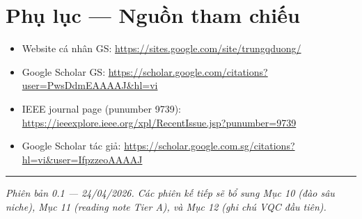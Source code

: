 \documentclass[11pt,a4paper]{article}
\begin{document}
\section*{Phụ lục --- Nguồn tham chiếu}

\begin{itemize}
  \item Website cá nhân GS: \url{https://sites.google.com/site/trungqduong/}
  \item Google Scholar GS: \url{https://scholar.google.com/citations?user=PwsDdmEAAAAJ&hl=vi}
  \item IEEE journal page (punumber 9739): \url{https://ieeexplore.ieee.org/xpl/RecentIssue.jsp?punumber=9739}
  \item Google Scholar tác giả: \url{https://scholar.google.com.sg/citations?hl=vi&user=IfpzzeoAAAAJ}
\end{itemize}

\vspace{0.5cm}
\hrule
\vspace{0.3cm}
\textit{\small Phiên bản 0.1 --- 24/04/2026. Các phiên kế tiếp sẽ bổ sung Mục 10 (đào sâu niche), Mục 11 (reading note Tier A), và Mục 12 (ghi chú VQC đầu tiên).}
\end{document}
